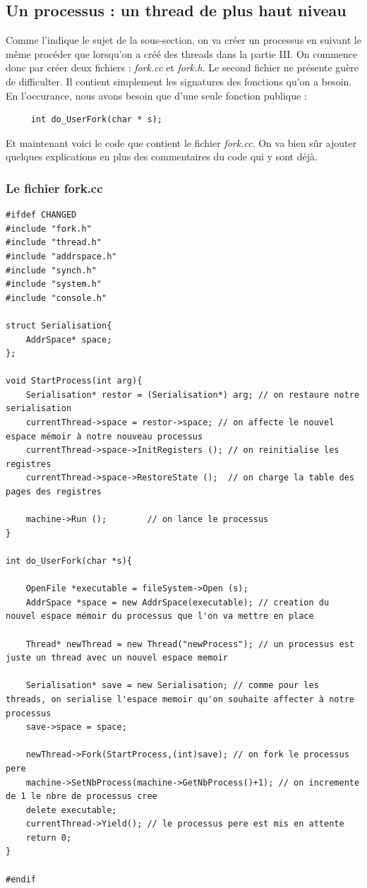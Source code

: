\documentclass[a4paper,10pt]{report}
\begin{document}
  \newpage
    \textcolor{NavyBlue}{\subsection{Un processus : un thread de plus haut niveau}}
    Comme l'indique le sujet de la sous-section, on va créer un processus en suivant le même procéder que lorsqu'on a créé des threads dans la partie III.
    On commence donc par créer deux fichiers : \emph{fork.cc} et \emph{fork.h}. Le second fichier ne présente guère de difficulter. Il contient simplement
    les signatures des fonctions qu'on a besoin. En l'occurance, nous avons besoin que d'une seule fonction publique :
    \begin{lstlisting}
     int do_UserFork(char * s);
    \end{lstlisting}
    Et maintenant voici le code que contient le fichier \emph{fork.cc}. On va bien sûr ajouter quelques explications en plus des commentaires du code qui 
    y sont déjà.
    \textcolor{TealBlue}{\subsubsection*{Le fichier fork.cc}}
    \begin{lstlisting}
#ifdef CHANGED
#include "fork.h"
#include "thread.h"
#include "addrspace.h"
#include "synch.h"
#include "system.h"
#include "console.h"

struct Serialisation{
	AddrSpace* space;
};

void StartProcess(int arg){
	Serialisation* restor = (Serialisation*) arg; // on restaure notre serialisation 
	currentThread->space = restor->space; // on affecte le nouvel espace mémoir à notre nouveau processus
	currentThread->space->InitRegisters ();	// on reinitialise les registres
	currentThread->space->RestoreState ();	// on charge la table des pages des registres

	machine->Run ();		// on lance le processus
}

int do_UserFork(char *s){

	OpenFile *executable = fileSystem->Open (s);
	AddrSpace *space = new AddrSpace(executable); // creation du nouvel espace mémoir du processus que l'on va mettre en place

	Thread* newThread = new Thread("newProcess"); // un processus est juste un thread avec un nouvel espace memoir
  
	Serialisation* save = new Serialisation; // comme pour les threads, on serialise l'espace memoir qu'on souhaite affecter à notre processus
	save->space = space;

	newThread->Fork(StartProcess,(int)save); // on fork le processus pere
	machine->SetNbProcess(machine->GetNbProcess()+1); // on incremente de 1 le nbre de processus cree
	delete executable;
	currentThread->Yield(); // le processus pere est mis en attente
	return 0;
}

#endif 

    \end{lstlisting}
\end{document}
